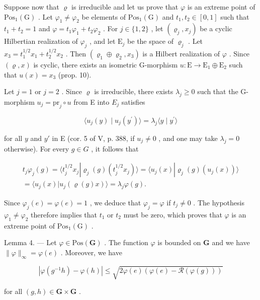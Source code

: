 Suppose now that \(\varrho\) is irreducible and let us prove that \(\varphi\) is an extreme point of \(\mathrm{Pos}_1(\mathrm{G})\) . Let \(\varphi_1 \neq \varphi_2\) be elements of \(\mathrm{Pos}_1(\mathrm{G})\) and \(t_1, t_2 \in [0,1]\) such that \(t_1 + t_2 = 1\) and \(\varphi = t_1\varphi_1 + t_2\varphi_2\) . For \(j \in \{1,2\}\) , let \((\varrho_j, x_j)\) be a cyclic Hilbertian realization of \(\varphi_j\) , and let \(\mathrm{E}_j\) be the space of \(\varrho_j\) . Let \(x_3 = t_1^{1/2}x_1 + t_2^{1/2}x_2\) . Then \((\varrho_1 \oplus \varrho_2, x_3)\) is a Hilbert realization of \(\varphi\) . Since \((\varrho, x)\) is cyclic, there exists an isometric G-morphism \(u: \mathrm{E} \to \mathrm{E}_1 \oplus \mathrm{E}_2\) such that \(u(x) = x_3\) (prop. 10).

Let \(j = 1\) or \(j = 2\) . Since \(\varrho\) is irreducible, there exists \(\lambda_j \geqslant 0\) such that the G-morphism \(u_j = \mathrm{pr}_j \circ u\) from E into \(E_j\) satisfies

\[
\langle u _ {j} (y) \mid u _ {j} (y ^ {\prime}) \rangle = \lambda_ {j} \langle y \mid y ^ {\prime} \rangle
\]

for all \(y\) and \(y'\) in E (cor. 5 of V, p. 388, if \(u_j \neq 0\) , and one may take \(\lambda_j = 0\) otherwise). For every \(g \in G\) , it follows that

\[
\begin{array}{r} t _ {j} \varphi_ {j} (g) = \langle t _ {j} ^ {1 / 2} x _ {j} | \varrho_ {j} (g) (t _ {j} ^ {1 / 2} x _ {j}) \rangle = \langle u _ {j} (x) | \varrho_ {j} (g) (u _ {j} (x)) \rangle \\ = \langle u _ {j} (x) | u _ {j} (\varrho (g) x) \rangle = \lambda_ {j} \varphi (g). \end{array}
\]

Since \(\varphi_{j}(e) = \varphi(e) = 1\) , we deduce that \(\varphi_{j} = \varphi\) if \(t_{j} \neq 0\) . The hypothesis \(\varphi_{1} \neq \varphi_{2}\) therefore implies that \(t_{1}\) or \(t_{2}\) must be zero, which proves that \(\varphi\) is an extreme point of \(\mathrm{Pos}_{1}(\mathrm{G})\) .

Lemma 4. --- Let \(\varphi\in\mathrm{Pos}(\mathbf{G})\) . The function \(\varphi\) is bounded on \(\mathbf{G}\) and we have \(\|\varphi\|_{\infty}=\varphi(e)\) . Moreover, we have

\[
| \varphi (g ^ {- 1} h) - \varphi (h) | \leqslant \sqrt {2 \varphi (e) (\varphi (e) - \mathcal {R} (\varphi (g)))}\tag{1}
\]

for all \((g,h)\in \mathbf{G}\times \mathbf{G}\) .

